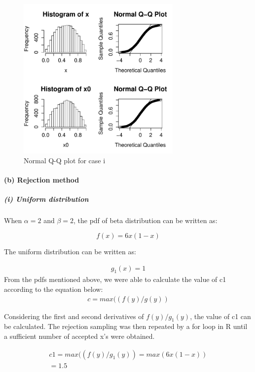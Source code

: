 \documentclass[10pt, letterpaper]{proc}
\begin{document}
\begin{figure}
	\centering \includegraphics[width=8cm]{beta1}
	\caption{Normal Q-Q plot for case i}
\end{figure}


\paragraph{(b) Rejection method} 

\subparagraph{(i) Uniform distribution}
When $\alpha = 2$ and $\beta = 2$, the pdf of beta distribution can be written as: 


\begin{equation}
f (x) = 6x(1-x)
\end{equation}

The uniform distribution can be written as:

\begin{equation}
\begin{aligned}
g_1 (x) = 1
\end{aligned}
\end{equation}
From the pdfs mentioned above, we were able to calculate the value of c1 according to the equation below:
\begin{equation}
\begin{aligned}
c = max((f(y)/g(y))
\end{aligned}
\end{equation}

Considering the first and second derivatives of $f(y)/g_1(y)$, the value of c1 can be calculated. The rejection sampling was then repeated by a for loop in R until a sufficient number of accepted x's were obtained.

\begin{equation}
\begin{aligned}
c1 = max((f(y)/g_1(y)) = max(6x(1-x)) \\= 1.5
\end{aligned}
\end{equation}
\end{document}
